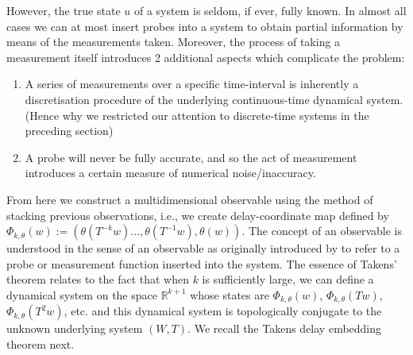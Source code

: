 \documentclass[a4paper,12pt,twoside]{report}
\begin{document}

However, the true state $u$ of a system is seldom, if ever, fully known. In almost all cases we can at most insert probes into a system to obtain partial information by means of the measurements taken. Moreover, the process of taking a measurement itself introduces 2 additional aspects which complicate the problem: 
\vspace{-8mm}
\begin{enumerate}[noitemsep, label=\roman*.]
  \item A series of measurements over a specific time-interval is inherently a discretisation procedure of the underlying continuous-time dynamical system. (Hence why we restricted our attention to discrete-time systems in the preceding section)
  \item A probe will never be fully accurate, and so the act of measurement introduces a certain measure of numerical noise/inaccuracy.
\end{enumerate}



From here we construct a multidimensional observable using the method of stacking previous observations, i.e., we create delay-coordinate map defined by
$\Phi_{k,\theta}(w) := (\theta(T^{-k}w)\ldots,\theta(T^{-1}w),\theta(w))$.  
The concept of an observable is understood in the sense of an observable as originally introduced by \cite{takens1981detecting, genericObservableAeyels} to refer to a probe or measurement function inserted into the system. 
The essence of Takens' theorem relates to the fact that when $k$ is sufficiently large, we can define a dynamical system on the space $\mathbb{R}^{k+1}$ whose states are $\Phi_{k,\theta}(w)$, $\Phi_{k,\theta}(Tw)$, $\Phi_{k,\theta}(T^2w)$, etc. and this dynamical system is topologically conjugate to the unknown underlying system $(W,T)$. We recall the Takens delay embedding theorem next.


\end{document}
